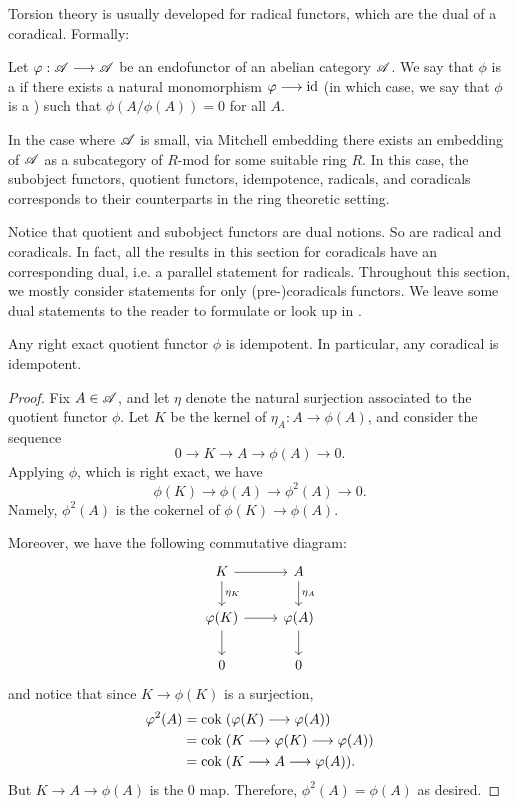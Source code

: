 Torsion theory is usually developed for radical functors, which 
are the dual of a coradical. Formally:

\begin{defn}\label{def_radical}
Let $\varphi: \mathscr{A} \longrightarrow \mathscr{A}$ be an endofunctor of an abelian 
category $\mathscr{A}$. We say that $\phi$ is a  if 
there exists a natural monomorphism $\varphi \longrightarrow \mathrm{id}$ (in which case, we
say that $\phi$ is a ) such that 
$\phi(A/\phi(A)) = 0$ for all $A$. 
\end{defn}

\begin{rmk}
In the case where $\mathscr{A}$ is small, via Mitchell embedding 
there exists an embedding of $\mathscr{A}$ as a subcategory of $R$-mod
for some suitable ring $R$. In this case, the subobject functors, 
quotient functors, idempotence, radicals, and coradicals 
corresponds to their counterparts in the ring theoretic setting.
\end{rmk}

\begin{rmk}\label{rmk_rad_corad_dual}
Notice that quotient and subobject functors are dual notions. So 
are radical and coradicals. In fact, all the results in this 
section for coradicals have an corresponding dual, i.e. a parallel 
statement for radicals. Throughout this section, we mostly 
consider statements for only (pre-)coradicals functors. We leave 
some dual statements to the reader to formulate or look up in 
\cite{DTor}.
\end{rmk}

\begin{prop}\label{prop_idempotence}
Any right exact quotient functor $\phi$ is idempotent. In 
particular, any coradical is idempotent.
\end{prop}
\begin{proof}
Fix $A \in \mathscr{A}$, and let $\eta$ denote the natural surjection 
associated to the quotient functor $\phi$. Let $K$ be the kernel 
of $\eta_A: A \to \phi(A)$, and consider the sequence
\[
0 \to K \to A \to \phi(A) \to 0.
\]
Applying $\phi$, which is right exact, we have
\[
\phi(K) \to \phi(A) \to \phi^2(A) \to 0.
\]
Namely, $\phi^2(A)$ is the cokernel of $\phi(K) \to \phi(A)$.

Moreover, we have the following commutative diagram:
\[
\begin{tikzcd}
K \arrow{r} \arrow{d}{\eta_K} &
A \arrow{d}{\eta_A} \\
\phi(K) \arrow{r} \arrow{d} &
\phi(A) \arrow{d} \\
0 & 0
\end{tikzcd}
\]
and notice that since $K \to \phi(K)$ is a surjection,
\begin{align*}
\varphi^2(A) &= \mathrm{cok}\; (\varphi(K) \longrightarrow \varphi(A)) \\
          &= \mathrm{cok}\; (K \longrightarrow \varphi(K) \longrightarrow \varphi(A)) \\
          &= \mathrm{cok}\; (K \longrightarrow A \longrightarrow \varphi(A)).
\end{align*}
But $K \to A \to \phi(A)$ is the $0$ map. Therefore, $\phi^2(A) = 
\phi(A)$ as desired.
\end{proof}

